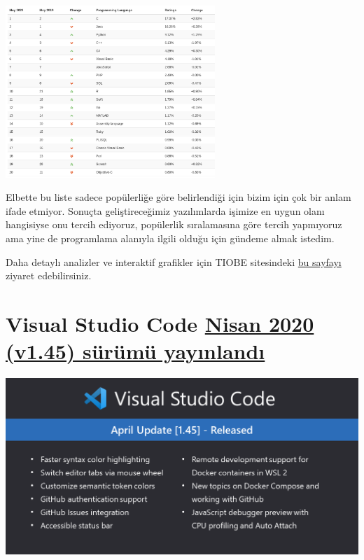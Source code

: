 \documentclass[11pt]{article}
\begin{document}
\begin{center}
\includegraphics[height=6.5cm]{gorseller/tiobe-index.png}
\end{center}

Elbette bu liste sadece popülerliğe göre belirlendiği için bizim için çok bir
anlam ifade etmiyor. Sonuçta geliştireceğimiz yazılımlarda işimize en uygun
olanı hangisiyse onu tercih ediyoruz, popülerlik sıralamasına göre tercih
yapmıyoruz ama yine de programlama alanıyla ilgili olduğu için gündeme almak
istedim.

Daha detaylı analizler ve interaktif grafikler için TIOBE sitesindeki \href{https://www.tiobe.com/tiobe-index/}{bu
sayfayı} ziyaret edebilirsiniz.
\section{Visual Studio Code \href{https://code.visualstudio.com/updates/v1\_45}{Nisan 2020 (v1.45) sürümü yayınlandı}}
\label{sec:org2eb3e0c}
\begin{center}
\includegraphics[width=.9\linewidth]{gorseller/vscode1-45.png}
\end{center}
\end{document}
